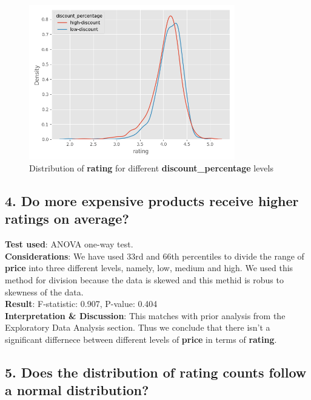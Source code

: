 \documentclass[a4paper,12pt]{article}
\begin{document}
\begin{figure}[H]
    \centering
    \includegraphics[width=0.8\textwidth]{./images/distro_of_rating_for_different_discount_percentages.png} %
    \caption{Distribution of \textbf{rating} for different \textbf{discount\_percentage} levels}
    \label{fig:Figure_8}
\end{figure}

\subsection*{4. Do more expensive products receive higher ratings on average?}

\noindent\textbf{Test used}: ANOVA one-way test. \\ 

\noindent\textbf{Considerations}: We have used 33rd and 66th percentiles to divide the range of \textbf{price} into three different levels, namely, low, medium and high. We used this method for division because the data is skewed and this methid is robus to skewness of the data. \\ 

\noindent\textbf{Result}: F-statistic: 0.907, P-value: 0.404 \\ 

\noindent\textbf{Interpretation \& Discussion}: This matches with prior analysis from the Exploratory Data Analysis section. Thus we conclude that there isn't a significant differnece between different levels of \textbf{price} in terms of \textbf{rating}. \\ 

\subsection*{5. Does the distribution of rating counts follow a normal distribution?}
\end{document}
